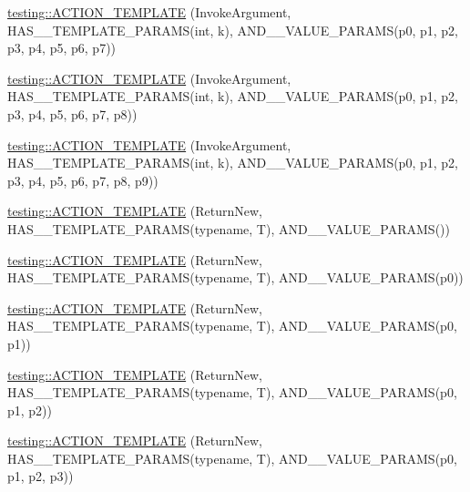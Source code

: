 \begin{DoxyCompactItemize}
\item 
\hyperlink{namespacetesting_a8725892aafb62cc8f6f76280d29595d8}{testing\+::\+A\+C\+T\+I\+O\+N\+\_\+\+T\+E\+M\+P\+L\+A\+TE} (Invoke\+Argument, H\+A\+S\+\_\+\_\+\+T\+E\+M\+P\+L\+A\+T\+E\+\_\+\+P\+A\+R\+A\+MS(int, k), A\+N\+D\+\_\+\_\+\+V\+A\+L\+U\+E\+\_\+\+P\+A\+R\+A\+MS(p0, p1, p2, p3, p4, p5, p6, p7))
\item 
\hyperlink{namespacetesting_a910551adbfeb1854071ef55ae54a5c0f}{testing\+::\+A\+C\+T\+I\+O\+N\+\_\+\+T\+E\+M\+P\+L\+A\+TE} (Invoke\+Argument, H\+A\+S\+\_\+\_\+\+T\+E\+M\+P\+L\+A\+T\+E\+\_\+\+P\+A\+R\+A\+MS(int, k), A\+N\+D\+\_\+\_\+\+V\+A\+L\+U\+E\+\_\+\+P\+A\+R\+A\+MS(p0, p1, p2, p3, p4, p5, p6, p7, p8))
\item 
\hyperlink{namespacetesting_ab7bf885ff274cbdc09f19c39e43b7f2b}{testing\+::\+A\+C\+T\+I\+O\+N\+\_\+\+T\+E\+M\+P\+L\+A\+TE} (Invoke\+Argument, H\+A\+S\+\_\+\_\+\+T\+E\+M\+P\+L\+A\+T\+E\+\_\+\+P\+A\+R\+A\+MS(int, k), A\+N\+D\+\_\+\_\+\+V\+A\+L\+U\+E\+\_\+\+P\+A\+R\+A\+MS(p0, p1, p2, p3, p4, p5, p6, p7, p8, p9))
\item 
\hyperlink{namespacetesting_a468e601467d018ab7566f321d3f7e871}{testing\+::\+A\+C\+T\+I\+O\+N\+\_\+\+T\+E\+M\+P\+L\+A\+TE} (Return\+New, H\+A\+S\+\_\+\_\+\+T\+E\+M\+P\+L\+A\+T\+E\+\_\+\+P\+A\+R\+A\+MS(typename, T), A\+N\+D\+\_\+\_\+\+V\+A\+L\+U\+E\+\_\+\+P\+A\+R\+A\+MS())
\item 
\hyperlink{namespacetesting_af07e911d69b8efb03bddbd0332f79ba0}{testing\+::\+A\+C\+T\+I\+O\+N\+\_\+\+T\+E\+M\+P\+L\+A\+TE} (Return\+New, H\+A\+S\+\_\+\_\+\+T\+E\+M\+P\+L\+A\+T\+E\+\_\+\+P\+A\+R\+A\+MS(typename, T), A\+N\+D\+\_\+\_\+\+V\+A\+L\+U\+E\+\_\+\+P\+A\+R\+A\+MS(p0))
\item 
\hyperlink{namespacetesting_ad418620ed637e789f91d029f4fe85b4b}{testing\+::\+A\+C\+T\+I\+O\+N\+\_\+\+T\+E\+M\+P\+L\+A\+TE} (Return\+New, H\+A\+S\+\_\+\_\+\+T\+E\+M\+P\+L\+A\+T\+E\+\_\+\+P\+A\+R\+A\+MS(typename, T), A\+N\+D\+\_\+\_\+\+V\+A\+L\+U\+E\+\_\+\+P\+A\+R\+A\+MS(p0, p1))
\item 
\hyperlink{namespacetesting_ac24511eb64ebe2c2927feaf285ac3785}{testing\+::\+A\+C\+T\+I\+O\+N\+\_\+\+T\+E\+M\+P\+L\+A\+TE} (Return\+New, H\+A\+S\+\_\+\_\+\+T\+E\+M\+P\+L\+A\+T\+E\+\_\+\+P\+A\+R\+A\+MS(typename, T), A\+N\+D\+\_\+\_\+\+V\+A\+L\+U\+E\+\_\+\+P\+A\+R\+A\+MS(p0, p1, p2))
\item 
\hyperlink{namespacetesting_afc5a3710d11bdee2023d8402b84d86ed}{testing\+::\+A\+C\+T\+I\+O\+N\+\_\+\+T\+E\+M\+P\+L\+A\+TE} (Return\+New, H\+A\+S\+\_\+\_\+\+T\+E\+M\+P\+L\+A\+T\+E\+\_\+\+P\+A\+R\+A\+MS(typename, T), A\+N\+D\+\_\+\_\+\+V\+A\+L\+U\+E\+\_\+\+P\+A\+R\+A\+MS(p0, p1, p2, p3))

\end{DoxyCompactItemize}
